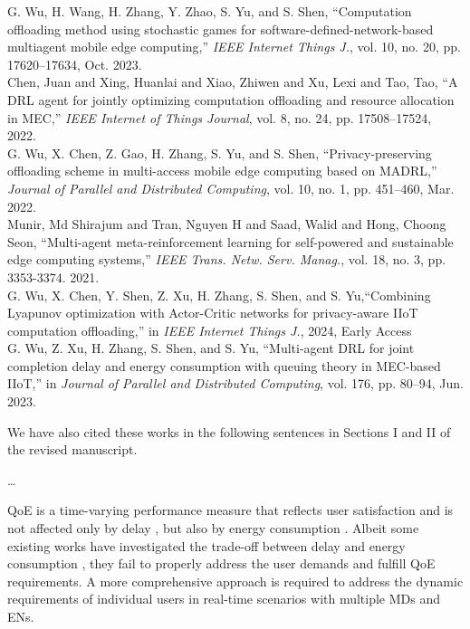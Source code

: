 \documentclass[12pt,draftclsnofoot,onecolumn]{IEEEtran}
\newcommand{\rev}[1]{{\color{blue}#1}} %
\newcommand{\rev}[1]{#1}
\newenvironment{my}[2]%
{\begin{list}{}%
{\setlength{\rightmargin}{#1}\setlength{\leftmargin}{#2}}%


 \item[]{}

} {\end{list}}
\begin{document}
\begin{enumerate}
\begin{my}{1cm}{1cm}
{{			\cite{wu2023computation} G. Wu, H. Wang, H. Zhang, Y. Zhao, S. Yu, and S. Shen, ``Computation offloading method using stochastic games for software-defined-network-based multiagent mobile edge computing,'' \textit{IEEE Internet Things J.}, vol. 10, no. 20, pp. 17620–17634, Oct. 2023.\\[6pt]
			\cite{chen2021drl} Chen, Juan and Xing, Huanlai and Xiao, Zhiwen and Xu, Lexi and Tao, Tao, ``A DRL agent for jointly optimizing computation offloading and resource allocation in MEC,'' \textit{IEEE Internet of Things Journal}, vol. 8, no. 24, pp. 17508--17524, 2022.\\[6pt]
			\cite{wu2024privacy} G. Wu, X. Chen, Z. Gao, H. Zhang, S. Yu, and S. Shen, ``Privacy-preserving offloading scheme in multi-access mobile edge computing based on MADRL,'' \textit{Journal of Parallel and Distributed Computing}, vol. 10, no. 1, pp. 451--460, Mar. 2022.\\[6pt]
			\cite{munir2021multi} Munir, Md Shirajum and Tran, Nguyen H and Saad, Walid and Hong, Choong Seon, ``Multi-agent meta-reinforcement learning for self-powered and sustainable edge computing systems,'' \textit{IEEE Trans. Netw. Serv. Manag.}, vol. 18, no. 3, pp. 3353-3374. 2021.\\[6pt]
			\cite{wu2024combining} G. Wu, X. Chen, Y. Shen, Z. Xu, H. Zhang, S. Shen, and S. Yu,``Combining Lyapunov optimization with Actor-Critic networks for privacy-aware IIoT computation offloading,'' in \textit{IEEE Internet Things J.}, 2024, Early Access\\[6pt]
			\cite{wu2023multi} G. Wu, Z. Xu, H. Zhang, S. Shen, and S. Yu,  ``Multi-agent DRL for joint completion delay and energy consumption with queuing theory in MEC-based IIoT,'' in \textit{Journal of Parallel and Distributed Computing}, vol. 176, pp. 80–94, Jun. 2023.
			\\[6pt]}}
\end{my}

	We have also cited these works in the following sentences in Sections I and II of the revised manuscript.\newline
	
\begin{my}{1cm}{1cm}
		\rev{
			{
	
	\dots
	
	QoE is a time-varying performance measure that reflects user satisfaction and is not affected only by delay \cite{guo2022energy}, but also by energy consumption \cite{tang2022uav}. Albeit some existing works have investigated the trade-off between delay and energy consumption \cite{li2022joint}, they fail to properly address the user demands and fulfill QoE requirements. A more comprehensive approach is required to address the dynamic requirements of individual users in real-time scenarios with multiple MDs and ENs.
	
}}
\end{my}
\end{enumerate}
\end{document}
